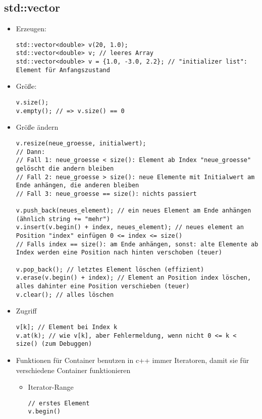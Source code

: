 \documentclass[a4paper]{scrartcl}
\theoremstyle{definition}
\theoremstyle{plain}
\theoremstyle{remark}
\theoremstyle{remark}
\begin{document}
\subsection{std::vector}
\label{sec-11-1}
\begin{itemize}
\item Erzeugen:
\begin{verbatim}
std::vector<double> v(20, 1.0);
std::vector<double> v; // leeres Array
std::vector<double> v = {1.0, -3.0, 2.2}; // "initializer list": Element für Anfangszustand
\end{verbatim}
\item Größe:
\begin{verbatim}
v.size();
v.empty(); // => v.size() == 0
\end{verbatim}
\item Größe ändern
\begin{verbatim}
v.resize(neue_groesse, initialwert);
// Dann:
// Fall 1: neue_groesse < size(): Element ab Index "neue_groesse" gelöscht die andern bleiben
// Fall 2: neue_groesse > size(): neue Elemente mit Initialwert am Ende anhängen, die anderen bleiben
// Fall 3: neue_groesse == size(): nichts passiert

v.push_back(neues_element); // ein neues Element am Ende anhängen (ähnlich string += "mehr")
v.insert(v.begin() + index, neues_element); // neues element an Position "index" einfügen 0 <= index <= size()
// Falls index == size(): am Ende anhängen, sonst: alte Elemente ab Index werden eine Position nach hinten verschoben (teuer)

v.pop_back(); // letztes Element löschen (effizient)
v.erase(v.begin() + index); // Element an Position index löschen, alles dahinter eine Position verschieben (teuer)
v.clear(); // alles löschen
\end{verbatim}
\item Zugriff
\begin{verbatim}
v[k]; // Element bei Index k
v.at(k); // wie v[k], aber Fehlermeldung, wenn nicht 0 <= k < size() (zum Debuggen)
\end{verbatim}
\item Funktionen für Container benutzen in c++ immer Iteratoren, damit sie für verschiedene Container funktionieren
\begin{itemize}
\item Iterator-Range
\begin{verbatim}
// erstes Element
v.begin()


\end{verbatim}
\end{itemize}
\end{itemize}
\end{document}
